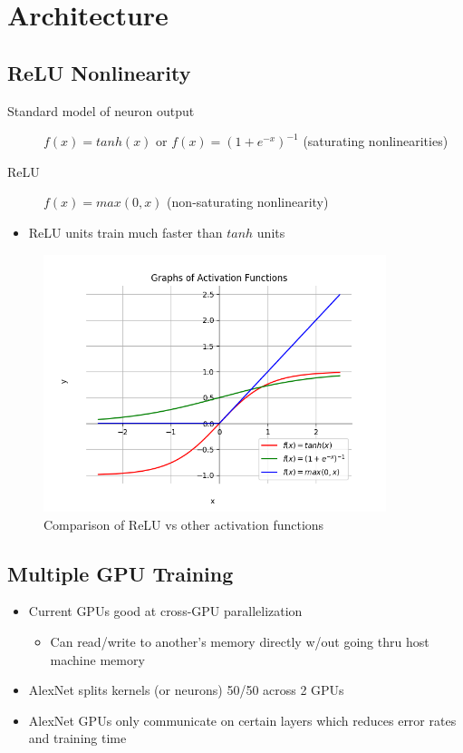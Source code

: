 \documentclass[a4paper,12pt]{article}
\begin{document}
\section{Architecture}
\subsection{ReLU Nonlinearity}
\begin{description}
  \item[Standard model of neuron output] $f(x) = tanh(x)$ or $f(x) = (1 + e^{-x})^{-1}$ (saturating nonlinearities)
  \item[ReLU] $f(x) = max(0, x)$ (non-saturating nonlinearity)
\end{description}
\begin{itemize}
  \item ReLU units train much faster than $tanh$ units
\end{itemize}

\begin{figure}[t]
  \centering
  \includegraphics[width=100mm, scale=0.5]{images/ReLU.png}
  \caption{Comparison of ReLU vs other activation functions}
  \label{ReLU}
\end{figure}

\subsection{Multiple GPU Training}
\begin{itemize}
  \item Current GPUs good at cross-GPU parallelization
    \begin{itemize}
      \item Can read/write to another's memory directly w/out going thru host machine memory
    \end{itemize}
  \item AlexNet splits kernels (or neurons) 50/50 across 2 GPUs
  \item AlexNet GPUs only communicate on certain layers which reduces error rates and training time
\end{itemize}
\end{document}
